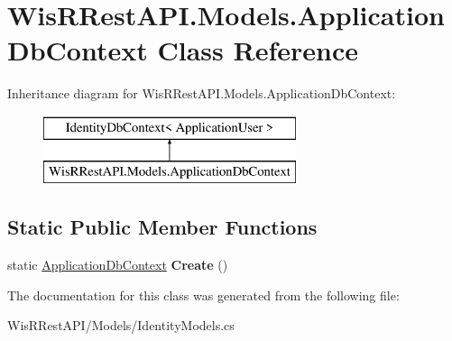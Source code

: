 \hypertarget{class_wis_r_rest_a_p_i_1_1_models_1_1_application_db_context}{}\section{Wis\+R\+Rest\+A\+P\+I.\+Models.\+Application\+Db\+Context Class Reference}
\label{class_wis_r_rest_a_p_i_1_1_models_1_1_application_db_context}
Inheritance diagram for Wis\+R\+Rest\+A\+P\+I.\+Models.\+Application\+Db\+Context\+:\begin{figure}[H]
\begin{center}
\leavevmode
\includegraphics[height=2.000000cm]{class_wis_r_rest_a_p_i_1_1_models_1_1_application_db_context}
\end{center}
\end{figure}
\subsection*{Static Public Member Functions}
\begin{DoxyCompactItemize}
\item 
\hypertarget{class_wis_r_rest_a_p_i_1_1_models_1_1_application_db_context_ae2ae7411755239494f5a6000694ff4b1}{}static \hyperlink{class_wis_r_rest_a_p_i_1_1_models_1_1_application_db_context}{Application\+Db\+Context} {\bfseries Create} ()\label{class_wis_r_rest_a_p_i_1_1_models_1_1_application_db_context_ae2ae7411755239494f5a6000694ff4b1}

\end{DoxyCompactItemize}


The documentation for this class was generated from the following file\+:\begin{DoxyCompactItemize}
\item 
Wis\+R\+Rest\+A\+P\+I/\+Models/Identity\+Models.\+cs\end{DoxyCompactItemize}
